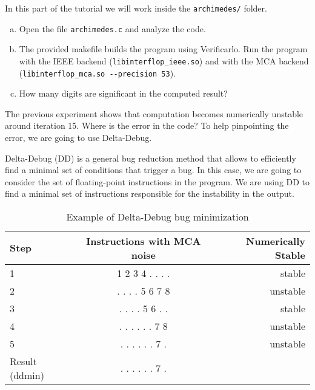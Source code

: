 In this part of the tutorial we will work inside the \texttt{archimedes/} folder.

\begin{question}
  \begin{enumerate}[(a)]
    \item Open the file \texttt{archimedes.c} and analyze the code.
    \item The provided makefile builds the program using Verificarlo. Run the program
          with the IEEE backend (\texttt{libinterflop\_ieee.so}) and with the MCA backend
          (\texttt{libinterflop\_mca.so -{}-precision 53}).
    \item How many digits are significant in the computed result?
  \end{enumerate}
\end{question}

The previous experiment shows that computation becomes numerically unstable
around iteration 15. Where is the error in the code? To help pinpointing the error,
we are going to use Delta-Debug.

Delta-Debug (DD) is a general bug reduction method that allows to efficiently find a
minimal set of conditions that trigger a bug. In this case, we are going to consider
the set of floating-point instructions in the program. We are using DD to
find a minimal set of instructions responsible for the instability in the output.

\begin{table}[h]
  \centering
  \begin{tabular}{lcr}
    Step           & Instructions with MCA noise & Numerically Stable \\
    \midrule
    1              & 1 2 3 4 . . . .             & stable             \\
    2              & . . . . 5 6 7 8             & unstable           \\
    \midrule
    3              & . . . . 5 6 . .             & stable             \\
    4              & . . . . . . 7 8             & unstable           \\
    \midrule
    5              & . . . . . . 7 .             & unstable           \\
    Result (ddmin) & . . . . . . 7 .             &                    \\
  \end{tabular}
  \caption{Example of Delta-Debug bug minimization\label{tab:deltadebug}}
\end{table}

